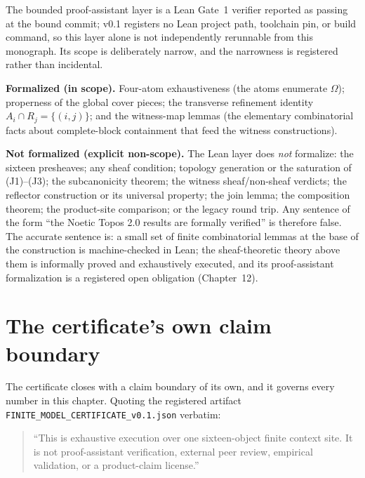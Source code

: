 The bounded proof-assistant layer is a Lean Gate~1 verifier reported as
passing at the bound commit; v0.1 registers no Lean project path, toolchain
pin, or build command, so this layer alone is not independently rerunnable
from this monograph. Its scope is deliberately narrow, and the
narrowness is registered rather than incidental.

\begin{checkclass}
\label{ch11:chk:lean}
\textbf{Formalized (in scope).} Four-atom exhaustiveness (the atoms
enumerate $\Omega$); properness of the global cover pieces; the transverse
refinement identity $A_i \cap R_j = \{(i, j)\}$; and the witness-map lemmas
(the elementary combinatorial facts about complete-block containment that
feed the witness constructions).
\end{checkclass}

\begin{boundary}
\label{ch11:bnd:leannonscope}
\textbf{Not formalized (explicit non-scope).} The Lean layer does
\emph{not} formalize: the sixteen presheaves; any sheaf condition; topology
generation or the saturation of (J1)--(J3); the subcanonicity theorem; the
witness sheaf/non-sheaf verdicts; the reflector construction or its
universal property; the join lemma; the composition theorem; the
product-site comparison; or the legacy round trip. Any sentence of the form
``the Noetic Topos 2.0 results are formally verified'' is therefore false.
The accurate sentence is: a small set of finite combinatorial lemmas at the
base of the construction is machine-checked in Lean; the sheaf-theoretic
theory above them is informally proved and exhaustively executed, and its
proof-assistant formalization is a registered open obligation
(Chapter~12).
\end{boundary}

\section{The certificate's own claim boundary}
\label{ch11:sec:boundary}

The certificate closes with a claim boundary of its own, and it governs
every number in this chapter. Quoting the registered artifact
\texttt{FINITE\_MODEL\_CERTIFICATE\_v0.1.json} verbatim:

\begin{quote}
``This is exhaustive execution over one sixteen-object finite context site.
It is not proof-assistant verification, external peer review, empirical
validation, or a product-claim license.''
\end{quote}

